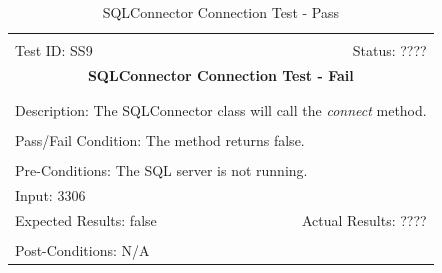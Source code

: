\documentclass[11pt]{article}
\begin{document}
\begin{center}
\begin{table}[H]
\begin{tabular}{|l r|}\hline&\\[-2mm]
	Test ID: SS9	&Status: ????\\[-3mm]
	\multicolumn{2}{|c|}{\textbf{\large{SQLConnector Connection Test - Fail}}}\\&\\\hline&\\[-3mm]
	\multicolumn{2}{|p{\textwidth}|}{Description: The SQLConnector class will call the \textit{connect} method.}\\[1mm]\hline&\\[-3mm]
	\multicolumn{2}{|p{\textwidth}|}{Pass/Fail Condition: The method returns false.}\\[1mm]\hline&\\[-3mm]
	\multicolumn{2}{|p{\textwidth}|}{Pre-Conditions: The SQL server is not running.}\\[4mm]
	\multicolumn{2}{|p{\textwidth}|}{Input: 3306}\\[2mm]\hline
	\multicolumn{1}{|p{0.49\textwidth}}{Expected Results: false}	&\multicolumn{1}{|p{0.45\textwidth}|}{Actual Results: ????}\\\hline&\\[-3mm]
	\multicolumn{2}{|p{\textwidth}|}{Post-Conditions: N/A}\\\hline
\end{tabular}
\caption{SQLConnector Connection Test - Pass}
\end{table}
\end{center}
\end{document}
